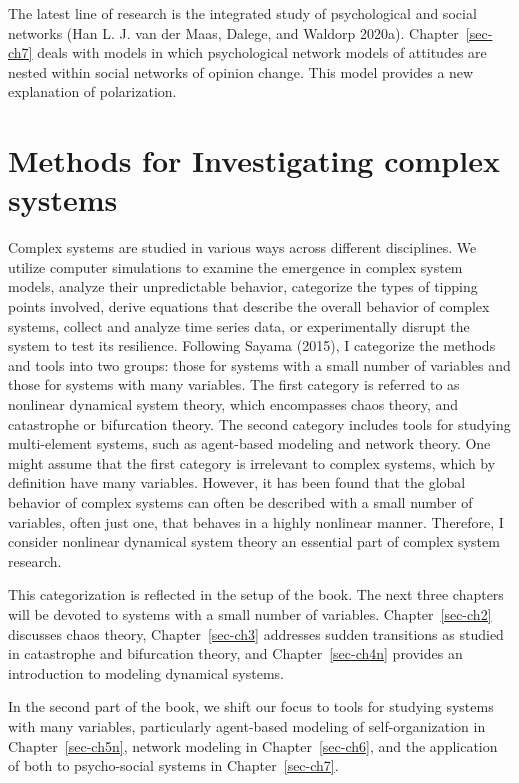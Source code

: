 \documentclass[
  a4paper,
  DIV=11,
  numbers=noendperiod,
  oneside]{scrreprt}
\begin{document}
The latest line of research is the integrated study of psychological and
social networks (Han L. J. van der Maas, Dalege, and Waldorp 2020a).
Chapter~\ref{sec-ch7} deals with models in which psychological network
models of attitudes are nested within social networks of opinion change.
This model provides a new explanation of polarization.

\hypertarget{sec-Methods-for-Investigating-complex-systems}{%
\section{Methods for Investigating complex
systems}\label{sec-Methods-for-Investigating-complex-systems}}

Complex systems are studied in various ways across different
disciplines. We utilize computer simulations to examine the emergence in
complex system models, analyze their unpredictable behavior, categorize
the types of tipping points involved, derive equations that describe the
overall behavior of complex systems, collect and analyze time series
data, or experimentally disrupt the system to test its resilience.
Following Sayama (2015), I categorize the methods and tools into two
groups: those for systems with a small number of variables and those for
systems with many variables. The first category is referred to as
nonlinear dynamical system theory, which encompasses chaos theory, and
catastrophe or bifurcation theory. The second category includes tools
for studying multi-element systems, such as agent-based modeling and
network theory. One might assume that the first category is irrelevant
to complex systems, which by definition have many variables. However, it
has been found that the global behavior of complex systems can often be
described with a small number of variables, often just one, that behaves
in a highly nonlinear manner. Therefore, I consider nonlinear dynamical
system theory an essential part of complex system research.

This categorization is reflected in the setup of the book. The next
three chapters will be devoted to systems with a small number of
variables. Chapter~\ref{sec-ch2} discusses chaos theory,
Chapter~\ref{sec-ch3} addresses sudden transitions as studied in
catastrophe and bifurcation theory, and Chapter~\ref{sec-ch4n} provides
an introduction to modeling dynamical systems.

In the second part of the book, we shift our focus to tools for studying
systems with many variables, particularly agent-based modeling of
self-organization in Chapter~\ref{sec-ch5n}, network modeling in
Chapter~\ref{sec-ch6}, and the application of both to psycho-social
systems in Chapter~\ref{sec-ch7}.
\end{document}
